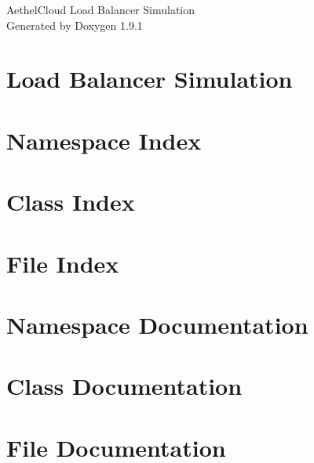 \let\mypdfximage\pdfximage\def\pdfximage{\immediate\mypdfximage}\documentclass[twoside]{book}
\newcommand{\+}{\discretionary{\mbox{\scriptsize$\hookleftarrow$}}{}{}}
\newcommand{\clearemptydoublepage}{%
  \newpage{\pagestyle{empty}\cleardoublepage}%
}
\begin{document}
\raggedbottom

\hypersetup{pageanchor=false,
             bookmarksnumbered=true,
             pdfencoding=unicode
            }
\begin{titlepage}
\vspace*{7cm}
\begin{center}%
{\Large Aethel\+Cloud Load Balancer Simulation }\\
\vspace*{1cm}
{\large Generated by Doxygen 1.9.1}\\
\end{center}
\end{titlepage}
\clearemptydoublepage
{}
\tableofcontents
\clearemptydoublepage
{}
\hypersetup{pageanchor=true}

\chapter{Load Balancer Simulation}
\label{index}\hypertarget{index}{}
\chapter{Namespace Index}

\chapter{Class Index}

\chapter{File Index}

\chapter{Namespace Documentation}



\chapter{Class Documentation}









\chapter{File Documentation}








\backmatter
\newpage
{}
\clearemptydoublepage
{}
\printindex
\end{document}
